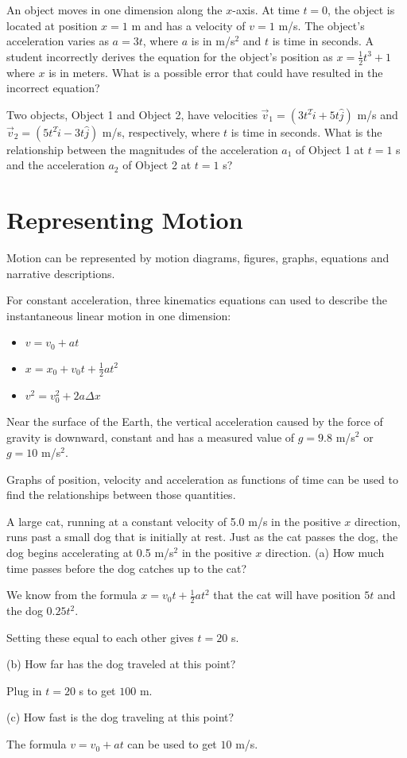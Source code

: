 \documentclass[../mech.tex]{subfiles}
\begin{document}
\ex An object moves in one dimension along the $x$-axis. At time $t=0$, the object is located at position $x=1$ m and has a velocity of $v=1$ m/s. The object's acceleration varies 
as $a=3t$, where $a$ is in m/s$^2$ and $t$ is time in seconds. A student incorrectly derives the equation for the object's position as $x=\frac{1}{2}t^3+1$ where $x$ is in meters. What is a possible error that could have resulted in the incorrect equation?

\ex Two objects, Object 1 and Object 2, have velocities $\vec{v}_1=(3t^2\hat{i}+5t\hat{j})$ m/s and $\vec{v}_2=(5t^2\hat{i}-3t\hat{j})$ m/s, respectively, where $t$ is time in seconds. What is the relationship between the magnitudes of the acceleration $a_1$ 
of Object 1 at $t=1$ s and the acceleration $a_2$ of Object 2 at $t=1$ s?

\section{Representing Motion}
Motion can be represented by motion diagrams, figures, graphs, equations and narrative descriptions.

For constant acceleration, three kinematics equations can used to describe the instantaneous linear motion in one dimension:
\begin{itemize}
    \item $v=v_0 + at$
    \item $x=x_0+v_0 t + \frac{1}{2}at^2$
    \item $v^2=v_0^2+2a\Delta x$
\end{itemize}

Near the surface of the Earth, the vertical acceleration caused by the force of gravity is downward, constant and has a measured value of $g=9.8$ m/s$^2$ or $g=10$ m/s$^2$.

Graphs of position, velocity and acceleration as functions of time can be used to find the relationships between those quantities.
\pagebreak
\begin{example}
    A large cat, running at a constant velocity of 5.0 m/s in the positive $x$ direction, runs past a small dog that is initially at rest. Just as the cat passes the dog, the dog begins accelerating at 0.5 m/s$^2$ in the positive $x$ direction.
    (a) How much time passes before the dog catches up to the cat?

    We know from the formula $x=v_0t+\frac{1}{2}at^2$ that the cat will have position $5t$ and the dog $0.25t^2$.

    Setting these equal to each other gives $t=20$ s.

    (b) How far has the dog traveled at this point?

    Plug in $t=20$ s to get $100$ m.

    (c) How fast is the dog traveling at this point?

    The formula $v=v_0+at$ can be used to get $10$ m/s.
\end{example}
\end{document}

